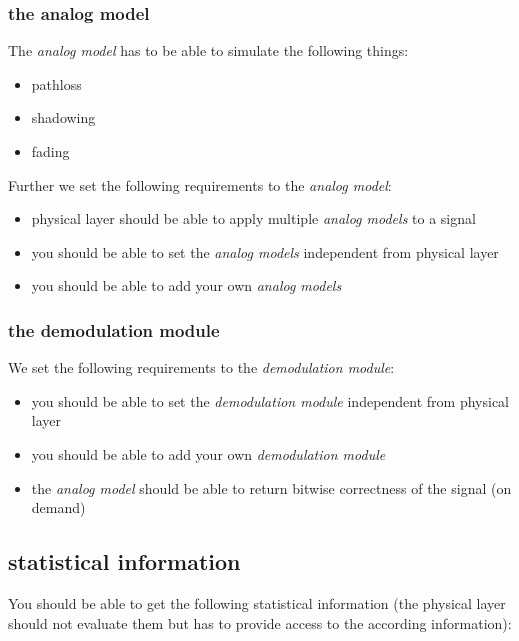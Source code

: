 \subsubsection{the analog model}

The \textit{analog model} has to be able to simulate the following things:

\begin{itemize}
 \item pathloss
 \item shadowing
 \item fading
\end{itemize}

Further we set the following requirements to the \textit{analog model}:

\begin{itemize}
 \item physical layer should be able to apply multiple \textit{analog models} to a signal
 \item you should be able to set the \textit{analog models} independent from physical layer
 \item you should be able to add your own \textit{analog models}
\end{itemize}

\subsubsection{the demodulation module}

We set the following requirements to the \textit{demodulation module}:

\begin{itemize}
 \item you should be able to set the \textit{demodulation module} independent from physical layer
 \item you should be able to add your own \textit{demodulation module}
 \item the \textit{analog model} should be able to return bitwise correctness of the signal (on demand)
\end{itemize}


\subsection{statistical information}

You should be able to get the following statistical information (the physical layer should not evaluate them but has to provide access to the according information):

